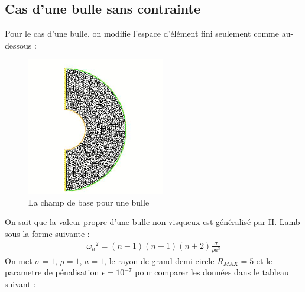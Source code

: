 \documentclass[a4paper]{report}
\begin{document}
\newpage
\subsection{Cas d'une bulle sans contrainte}
Pour le cas d'une bulle, on modifie l'espace d'élément fini seulement comme au-dessous :


\begin{figure}[h!] 
\begin{center}
\includegraphics[width=6cm]{2_3_3_Bulle}
\caption{La champ de base pour une bulle}
\end{center}
\end{figure}


On sait que la valeur propre d'une bulle non visqueux est généralisé par H. Lamb sous la forme suivante :
\begin{eqnarray*}
{\omega_n}^2 = (n-1) (n+1) (n+2) \frac{\sigma}{\rho a^3}
\end{eqnarray*}
On met $\sigma = 1$, $\rho = 1$, $a = 1$, le rayon de grand demi circle $R_{MAX} = 5$ et le parametre de pénalisation $\epsilon = 10^{-7}$ pour comparer les données dans le tableau suivant :
\end{document}
